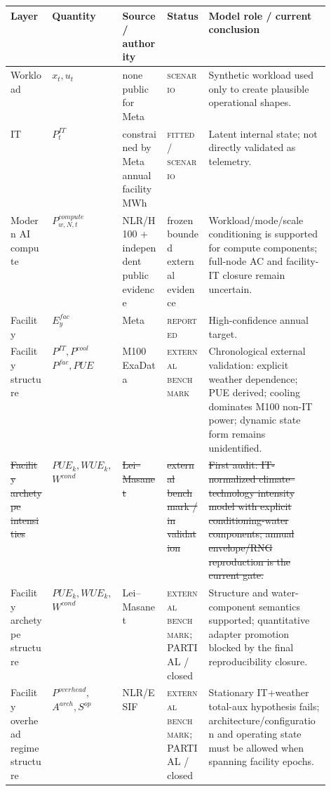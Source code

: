 \documentclass[11pt]{article}
\newcommand{\oldtxt}[1]{\textcolor{blue!70!black}{\sout{#1}}}
\newcommand{\newtxt}[1]{\textcolor{green!45!black}{#1}}
\newcommand{\latesttxt}[1]{\textcolor{purple!85!black}{#1}}
\newcommand{\Reported}{\textsc{reported}}
\newcommand{\Fitted}{\textsc{fitted}}
\newcommand{\Scenario}{\textsc{scenario}}
\newcommand{\Benchmark}{\textsc{external benchmark}}
\begin{document}
\begin{center}
\scriptsize
\begin{tabularx}{\linewidth}{@{}p{0.13\linewidth}p{0.13\linewidth}p{0.14\linewidth}p{0.13\linewidth}Y@{}}
\toprule
\textbf{Layer} & \textbf{Quantity} & \textbf{Source / authority} & \textbf{Status} & \textbf{Model role / current conclusion} \\
\midrule
Workload & \(x_t,u_t\) & none public for Meta & \Scenario & Synthetic workload used only to create plausible operational shapes. \\
IT & \(P^{IT}_t\) & constrained by Meta annual facility MWh & \Fitted / \Scenario & Latent internal state; not directly validated as telemetry. \\
\latesttxt{Modern AI compute} & \latesttxt{\(P^{compute}_{w,N,t}\)} & \latesttxt{NLR/H100 + independent public evidence} & \latesttxt{frozen bounded external evidence} & \latesttxt{Workload/mode/scale conditioning is supported for compute components; full-node AC and facility-IT closure remain uncertain.} \\
Facility & \(E^{fac}_y\) & Meta & \Reported & High-confidence annual target. \\
\newtxt{Facility structure} & \newtxt{\(P^{IT},P^{cool}\)\newline \(P^{fac},PUE\)} & \newtxt{M100 ExaData \cite{m100exadata}} & \newtxt{\Benchmark} & \newtxt{Chronological external validation: explicit weather dependence; PUE derived; cooling dominates M100 non-IT power; dynamic state form remains unidentified.} \\
\oldtxt{Facility archetype intensities} & \oldtxt{\(PUE_k,WUE_k,\)}\newline\oldtxt{\(W^{cond}\)} & \oldtxt{Lei--Masanet \cite{lei2022}} & \oldtxt{external benchmark / in validation} & \oldtxt{First audit: IT-normalized climate--technology intensity model with explicit conditioning-water components; annual envelope/RNG reproduction is the current gate.} \\
\latesttxt{Facility archetype structure} & \latesttxt{\(PUE_k,WUE_k,\)}\newline\latesttxt{\(W^{cond}\)} & \latesttxt{Lei--Masanet \cite{lei2022}} & \latesttxt{\Benchmark; PARTIAL / closed} & \latesttxt{Structure and water-component semantics supported; quantitative adapter promotion blocked by the final reproducibility closure.} \\
\latesttxt{Facility overhead regime structure} & \latesttxt{\(P^{overhead},\)}\newline\latesttxt{\(A^{arch},S^{op}\)} & \latesttxt{NLR/ESIF \cite{esifdata}} & \latesttxt{\Benchmark; PARTIAL / closed} & \latesttxt{Stationary IT+weather total-aux hypothesis fails; architecture/configuration and operating state must be allowed when spanning facility epochs.} \\

\end{tabularx}
\end{center}
\end{document}
